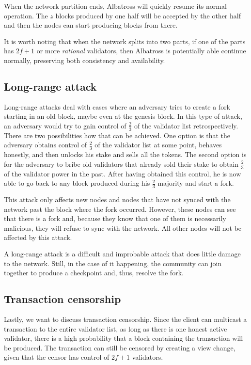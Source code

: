 \documentclass[conference]{IEEEtran}
\begin{document}
When the network partition ends, Albatross will quickly resume its normal operation. The $z$ blocks produced by one half will be accepted by the other half and then the nodes can start producing blocks from there.

It is worth noting that when the network splits into two parts, if one of the parts has $2f+1$ or more \textit{rational} validators, then Albatross is potentially able continue normally, preserving both consistency and availability.

\subsection{Long-range attack}
Long-range attacks deal with cases where an adversary tries to create a fork starting in an old block, maybe even at the genesis block. In this type of attack, an adversary would try to gain control of $\frac{2}{3}$ of the validator list retrospectively. There are two possibilities how that can be achieved. One option is that the adversary obtains control of $\frac{2}{3}$ of the validator list at some point, behaves honestly, and then unlocks his stake and sells all the tokens. The second option is for the adversary to bribe old validators that already sold their stake to obtain $\frac{2}{3}$ of the validator power in the past.
After having obtained this control, he is now able to go back to any block produced during his $\frac{2}{3}$ majority and start a fork.

This attack only affects new nodes and nodes that have not synced with the network past the block where the fork occurred. However, these nodes can see that there is a fork and, because they know that one of them is necessarily malicious, they will  refuse to sync with the network. All other nodes will not be affected by this attack.

A long-range attack is a difficult and improbable attack that does little damage to the network. Still, in the case of it happening, the community can join together to produce a checkpoint and, thus, resolve the fork.

\subsection{Transaction censorship}
Lastly, we want to discuss transaction censorship. Since the client can multicast a transaction to the entire validator list, as long as there is one honest active validator, there is a high probability that a block containing the transaction will be produced. The transaction can still be censored by creating a view change, given that the censor has control of $2f+1$ validators.
\end{document}
